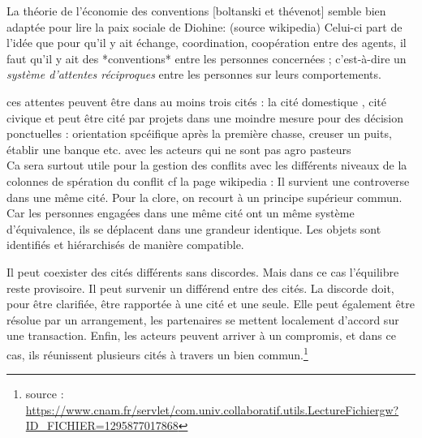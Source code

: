 La théorie de l'économie des conventions [boltanski et thévenot]  semble bien adaptée pour lire la paix sociale de Diohine: (source wikipedia) Celui-ci part de l'idée que pour qu'il y ait échange, coordination, coopération entre des agents, il faut qu'il y ait des *conventions* entre les personnes concernées ; c’est-à-dire un \textit{système d'attentes réciproques} entre les personnes sur leurs comportements.

ces attentes peuvent être dans au moins trois cités : la cité domestique , cité civique et peut être cité par projets dans une moindre mesure pour des décision ponctuelles : orientation spcéifique après la première chasse, creuser un puits, établir une banque etc. avec les acteurs qui ne sont pas agro pasteurs\\
Ca sera surtout utile pour la gestion des conflits avec les différents niveaux de la colonnes de spération du conflit  cf la page wikipedia : Il survient une controverse dans une même cité. Pour la clore, on recourt à un principe supérieur commun. Car les personnes engagées dans une même cité ont un même système d'équivalence, ils se déplacent dans une grandeur identique. Les objets sont identifiés et hiérarchisés de manière compatible.

Il peut coexister des cités différents sans discordes. Mais dans ce cas l'équilibre reste provisoire. Il peut survenir un différend entre des cités. La discorde doit, pour être clarifiée, être rapportée à une cité et une seule. Elle peut également être résolue par un arrangement, les partenaires se mettent localement d'accord sur une transaction. Enfin, les acteurs peuvent arriver à un compromis, et dans ce cas, ils réunissent plusieurs cités à travers un bien commun.\footnote{source : \url{ https://www.cnam.fr/servlet/com.univ.collaboratif.utils.LectureFichiergw?ID_FICHIER=1295877017868}}
